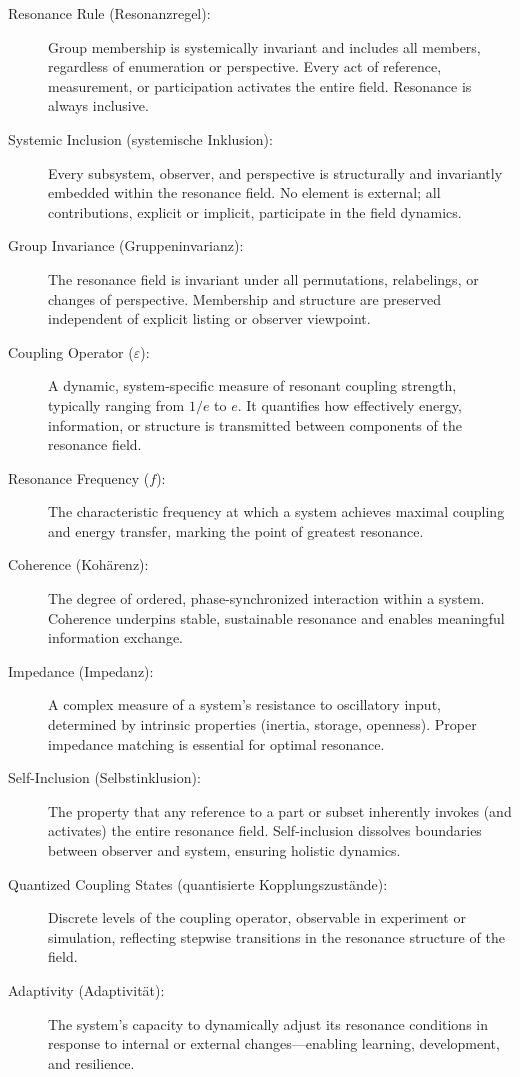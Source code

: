 \documentclass[12pt]{article}
\begin{document}
\begin{description}
	\item[Resonance Rule (Resonanzregel):]  
	Group membership is systemically invariant and includes all members, regardless of enumeration or perspective. Every act of reference, measurement, or participation activates the entire field. Resonance is always inclusive.
	
	\item[Systemic Inclusion (systemische Inklusion):]  
	Every subsystem, observer, and perspective is structurally and invariantly embedded within the resonance field. No element is external; all contributions, explicit or implicit, participate in the field dynamics.
	
	\item[Group Invariance (Gruppeninvarianz):]  
	The resonance field is invariant under all permutations, relabelings, or changes of perspective. Membership and structure are preserved independent of explicit listing or observer viewpoint.
	
	\item[Coupling Operator ($\varepsilon$):]  
	A dynamic, system-specific measure of resonant coupling strength, typically ranging from $1/e$ to $e$. It quantifies how effectively energy, information, or structure is transmitted between components of the resonance field.
	
	\item[Resonance Frequency ($f$):]  
	The characteristic frequency at which a system achieves maximal coupling and energy transfer, marking the point of greatest resonance.
	
	\item[Coherence (Kohärenz):]  
	The degree of ordered, phase-synchronized interaction within a system. Coherence underpins stable, sustainable resonance and enables meaningful information exchange.
	
	\item[Impedance (Impedanz):]  
	A complex measure of a system’s resistance to oscillatory input, determined by intrinsic properties (inertia, storage, openness). Proper impedance matching is essential for optimal resonance.
	
	\item[Self-Inclusion (Selbstinklusion):]  
	The property that any reference to a part or subset inherently invokes (and activates) the entire resonance field. Self-inclusion dissolves boundaries between observer and system, ensuring holistic dynamics.
	
	\item[Quantized Coupling States (quantisierte Kopplungszustände):]  
	Discrete levels of the coupling operator, observable in experiment or simulation, reflecting stepwise transitions in the resonance structure of the field.
	
	\item[Adaptivity (Adaptivität):]  
	The system’s capacity to dynamically adjust its resonance conditions in response to internal or external changes—enabling learning, development, and resilience.
\end{description}
\end{document}
